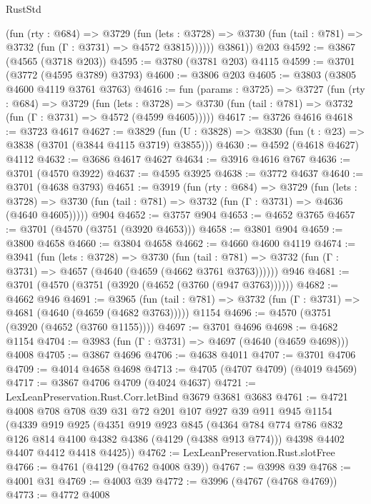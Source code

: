 \begin{lexlean}{RustStd}
\begin{coremodule}
{\begin{coremodule}
{{{{{{{{{{{{{{            (fun (rty : @684) =>
            @3729
              (fun (lets : @3728) =>
              @3730 (fun (tail : @781) => @3732 (fun (Γ : @3731) => @4572 @3815))))))
        @3861))
    @203
@4592 := @3867 (@4565 (@3718 @203))
@4595 := @3780 (@3781 @203) @4115
@4599 := @3701 (@3772 (@4595 @3789) @3793)
@4600 := @3806 @203
@4605 := @3803 (@3805 @4600 @4119 @3761 @3763)
@4616 := fun (params : @3725) =>
  @3727
    (fun (rty : @684) =>
    @3729
      (fun (lets : @3728) =>
      @3730 (fun (tail : @781) => @3732 (fun (Γ : @3731) => @4572 (@4599 @4605)))))
@4617 := @3726 @4616
@4618 := @3723 @4617
@4627 := @3829 (fun (U : @3828) => @3830 (fun (t : @23) => @3838 (@3701 (@3844 @4115 @3719) @3855)))
@4630 := @4592 (@4618 @4627) @4112
@4632 := @3686 @4617 @4627
@4634 := @3916 @4616 @767
@4636 := @3701 (@4570 @3922)
@4637 := @4595 @3925
@4638 := @3772 @4637
@4640 := @3701 (@4638 @3793)
@4651 := @3919
    (fun (rty : @684) =>
    @3729
      (fun (lets : @3728) =>
      @3730 (fun (tail : @781) => @3732 (fun (Γ : @3731) => @4636 (@4640 @4605)))))
    @904
@4652 := @3757 @904
@4653 := @4652 @3765
@4657 := @3701 (@4570 (@3751 (@3920 @4653)))
@4658 := @3801 @904
@4659 := @3800 @4658
@4660 := @3804 @4658
@4662 := @4660 @4600 @4119
@4674 := @3941
    (fun (lets : @3728) =>
    @3730
      (fun (tail : @781) => @3732 (fun (Γ : @3731) => @4657 (@4640 (@4659 (@4662 @3761 @3763))))))
    @946
@4681 := @3701 (@4570 (@3751 (@3920 (@4652 (@3760 (@947 @3763))))))
@4682 := @4662 @946
@4691 := @3965
    (fun (tail : @781) => @3732 (fun (Γ : @3731) => @4681 (@4640 (@4659 (@4682 @3763)))))
    @1154
@4696 := @4570 (@3751 (@3920 (@4652 (@3760 @1155))))
@4697 := @3701 @4696
@4698 := @4682 @1154
@4704 := @3983 (fun (Γ : @3731) => @4697 (@4640 (@4659 @4698))) @4008
@4705 := @3867 @4696
@4706 := @4638 @4011
@4707 := @3701 @4706
@4709 := @4014 @4658 @4698
@4713 := @4705 (@4707 @4709) (@4019 @4569)
@4717 := @3867 @4706 @4709 (@4024 @4637)
@4721 := LexLeanPreservation.Rust.Corr.letBind @3679 @3681 @3683
@4761 := @4721
    @4008
    @708
    @708
    @39
    @31
    @72
    @201
    @107
    @927
    @39
    @911
    @945
    @1154
    (@4339
      @919
      @925
      (@4351
        @919
        @923
        @845
        (@4364 @784 @774 @786 @832 @126 @814 @4100 @4382 @4386 (@4129 (@4388 @913 @774)))
        @4398
        @4402
        @4407
        @4412
        @4418
        @4425))
@4762 := LexLeanPreservation.Rust.slotFree
@4766 := @4761 (@4129 (@4762 @4008 @39))
@4767 := @3998 @39
@4768 := @4001 @31
@4769 := @4003 @39
@4772 := @3996 (@4767 (@4768 @4769))
@4773 := @4772 @4008
}}}}}}}}}}}}}}
\end{coremodule}}
\end{coremodule}
\end{lexlean}

